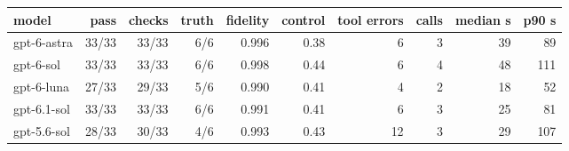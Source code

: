\begin{tabular}{lrrrrrrrrr}
\toprule
model & pass & checks & truth & fidelity & control & tool errors & calls & median s & p90 s \\
\midrule
gpt-6-astra & 33/33 & 33/33 & 6/6 & 0.996 & 0.38 & 6 & 3 & 39 & 89 \\
gpt-6-sol & 33/33 & 33/33 & 6/6 & 0.998 & 0.44 & 6 & 4 & 48 & 111 \\
gpt-6-luna & 27/33 & 29/33 & 5/6 & 0.990 & 0.41 & 4 & 2 & 18 & 52 \\
gpt-6.1-sol & 33/33 & 33/33 & 6/6 & 0.991 & 0.41 & 6 & 3 & 25 & 81 \\
gpt-5.6-sol & 28/33 & 30/33 & 4/6 & 0.993 & 0.43 & 12 & 3 & 29 & 107 \\
\bottomrule
\end{tabular}